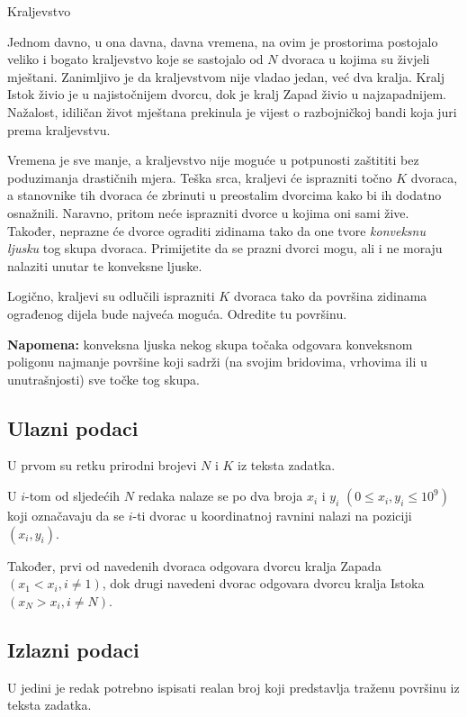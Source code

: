 \begin{statement}[
  problempoints=100,
  timelimit=1 sekunda,
  memorylimit=512 MiB,
]{Kraljevstvo}

Jednom davno, u ona davna, davna vremena, na ovim je prostorima postojalo
veliko i bogato kraljevstvo koje se sastojalo od $N$ dvoraca u kojima su živjeli
mještani. Zanimljivo je da kraljevstvom nije vladao jedan, već dva kralja.
Kralj Istok živio je u najistočnijem dvorcu, dok je kralj Zapad živio u
najzapadnijem. Nažalost, idiličan život mještana prekinula je vijest o
razbojničkoj bandi koja juri prema kraljevstvu.

Vremena je sve manje, a kraljevstvo nije moguće u potpunosti zaštititi bez
poduzimanja drastičnih mjera. Teška srca, kraljevi će isprazniti točno $K$
dvoraca, a stanovnike tih dvoraca će zbrinuti u preostalim dvorcima kako bi ih
dodatno osnažnili. Naravno, pritom neće isprazniti dvorce u kojima oni sami
žive. Također, neprazne će dvorce ograditi zidinama tako da one tvore
\textit{konveksnu ljusku} tog skupa dvoraca. Primijetite da se prazni dvorci
mogu, ali i ne moraju nalaziti unutar te konveksne ljuske.

Logično, kraljevi su odlučili isprazniti $K$ dvoraca tako da površina zidinama
ograđenog dijela bude najveća moguća. Odredite tu površinu.

\textbf{Napomena:} konveksna ljuska nekog skupa točaka odgovara konveksnom
poligonu najmanje površine koji sadrži (na svojim bridovima, vrhovima ili
u unutrašnjosti) sve točke tog skupa.

\subsection*{Ulazni podaci}
U prvom su retku prirodni brojevi $N$ i $K$ iz teksta zadatka.

U $i$-tom od sljedećih $N$ redaka nalaze se po dva broja $x_i$ i $y_i$ $(0 \leq
x_i, y_i \leq 10^9)$ koji označavaju da se $i$-ti dvorac u koordinatnoj
ravnini nalazi na poziciji $(x_i, y_i)$.

Također, prvi od navedenih dvoraca odgovara dvorcu kralja Zapada $(x_1 < x_i, i
\ne 1)$, dok drugi navedeni dvorac odgovara dvorcu kralja Istoka $(x_N > x_i,
i \ne N)$.

\subsection*{Izlazni podaci}
U jedini je redak potrebno ispisati realan broj koji predstavlja traženu
površinu iz teksta zadatka.


\end{statement}
